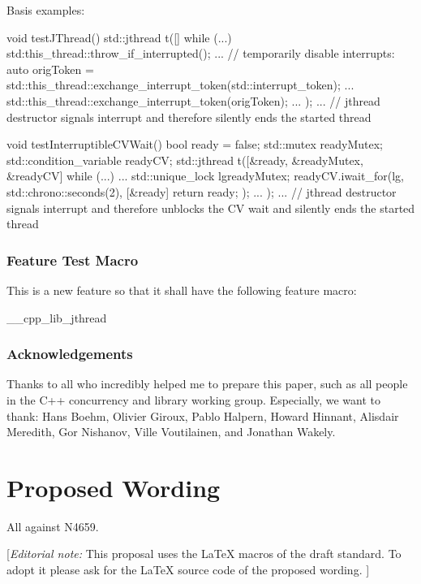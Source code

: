 Basis examples:
\begin{codeblock}
void testJThread() 
{
  std::jthread t([] {
                   while (...) {
                     std:this_thread::throw_if_interrupted();
                     ...
                     // temporarily disable interrupts:
                     auto origToken = std::this_thread::exchange_interrupt_token(std::interrupt_token{});
                     ...
                     std::this_thread::exchange_interrupt_token(origToken);
                     ...
                   }
                 });
  ...
} // jthread destructor signals interrupt and therefore silently ends the started thread
\end{codeblock}

\begin{codeblock}
void testInterruptibleCVWait() 
{
  bool ready = false;
  std::mutex readyMutex;
  std::condition_variable readyCV;
  std::jthread t([&ready, &readyMutex, &readyCV] {
                    while (...) {
                      ...
                      {
                        std::unique_lock lg{readyMutex};
                        readyCV.iwait_for(lg,
                                          std::chrono::seconds(2),
                                          [&ready] {
                                             return ready;
                                          });
                      }
                      ...
                    }
                  });
  ...
} // jthread destructor signals interrupt and therefore unblocks the CV wait and silently ends the started thread
\end{codeblock}

\subsubsection*{Feature Test Macro}

This is a new feature so that it shall have the following feature macro:
\begin{codeblock}
	__cpp_lib_jthread
\end{codeblock}


\subsubsection*{Acknowledgements}

Thanks to all who incredibly helped me to prepare this paper, such as all people in the C++ concurrency and library working group.
Especially, we want to thank: Hans Boehm, Olivier Giroux, Pablo Halpern, Howard Hinnant, Alisdair Meredith, Gor Nishanov, Ville Voutilainen, and Jonathan Wakely.


\section*{Proposed Wording}
All against N4659.

{\color{blue}
[{\itshape{}Editorial note:} This proposal uses the LaTeX macros of the draft standard.
        To adopt it please ask for the LaTeX source code of the proposed wording. ]
}

\clearpage

